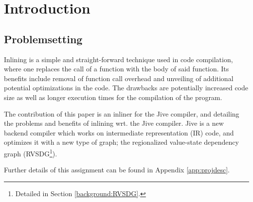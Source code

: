 
\section{Introduction}

\subsection{Problemsetting}


Inlining is a simple and straight-forward technique used in code compilation,
where one replaces the call of a function with the body of said function. Its
benefits include removal of function call overhead and unveiling of additional
potential optimizations in the code. The drawbacks are potentially increased
code size as well as longer execution times for the compilation of the program.

The contribution of this paper is an inliner for the Jive
compiler, and detailing the problems and benefits of inlining wrt. the Jive
compiler. Jive is a new backend compiler which works on intermediate
representation (IR) code, and optimizes it with a new type of graph; the
regionalized value-state dependency graph (RVSDG\footnote{Detailed in Section
\ref{background:RVSDG}.}).

Further details of this assignment can be found in Appendix
\ref{app:projdesc}.
